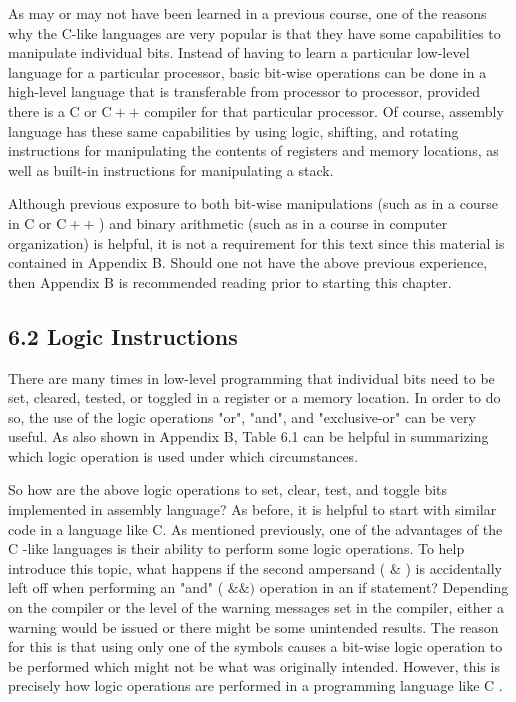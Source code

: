 \documentclass[10pt]{book}
\begin{document}
As may or may not have been learned in a previous course, one of the reasons why the C-like languages are very popular is that they have some capabilities to manipulate individual bits. Instead of having to learn a particular low-level language for a particular processor, basic bit-wise operations can be done in a high-level language that is transferable from processor to processor, provided there is a C or $\mathrm{C}++$ compiler for that particular processor. Of course, assembly language has these same capabilities by using logic, shifting, and rotating instructions for manipulating the contents of registers and memory locations, as well as built-in instructions for manipulating a stack.

Although previous exposure to both bit-wise manipulations (such as in a course in C or $\mathrm{C}++$ ) and binary arithmetic (such as in a course in computer organization) is helpful, it is not a requirement for this text since this material is contained in Appendix B. Should one not have the above previous experience, then Appendix B is recommended reading prior to starting this chapter.

\subsection*{6.2 Logic Instructions}
There are many times in low-level programming that individual bits need to be set, cleared, tested, or toggled in a register or a memory location. In order to do so, the use of the logic operations "or", "and", and "exclusive-or" can be very useful. As also shown in Appendix B, Table 6.1 can be helpful in summarizing which logic operation is used under which circumstances.

So how are the above logic operations to set, clear, test, and toggle bits implemented in assembly language? As before, it is helpful to start with similar code in a language like C. As mentioned previously, one of the advantages of the C -like languages is their ability to perform some logic operations. To help introduce this topic, what happens if the second ampersand ( $\&$ ) is accidentally left off when performing an "and" ( $\& \&)$ operation in an if statement? Depending on the compiler or the level of the warning messages set in the compiler, either a warning would be issued or there might be some unintended results. The reason for this is that using only one of the symbols causes a bit-wise logic operation to be performed which might not be what was originally intended. However, this is precisely how logic operations are performed in a programming language like C .
\end{document}
